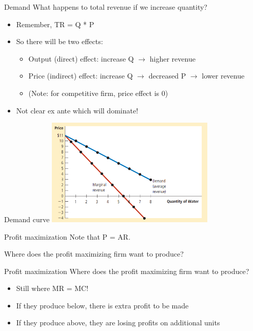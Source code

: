 \documentclass[aspectratio=169]{beamer}
\begin{document}
\begin{frame}{Demand}
    What happens to total revenue if we increase quantity?
    
    \begin{itemize}
        \item Remember, TR = Q * P
        \item So there will be two effects:
        \begin{itemize}
            \item Output (direct) effect: increase Q $\to$ higher revenue
            \item Price (indirect) effect: increase Q $\to$ decreased P $\to$ lower revenue
            \item (Note: for competitive firm, price effect is 0)
        \end{itemize}
        \item Not clear ex ante which will dominate!
    \end{itemize}
\end{frame}

\begin{frame}{Demand curve}
    \centering
    \includegraphics[width = 0.6\textwidth,keepaspectratio]{demandMR.png}
\end{frame}

\begin{frame}{Profit maximization}
    Note that P  = AR.
        
    \vspace{5mm}

    Where does the profit maximizing firm want to produce? 
\end{frame}

\begin{frame}{Profit maximization}
    Where does the profit maximizing firm want to produce? 

    \begin{itemize}
        \item Still where MR = MC!
        \item If they produce below, there is extra profit to be made
        \item If they produce above, they are losing profits on additional units
    \end{itemize}
\end{frame}
\end{document}
